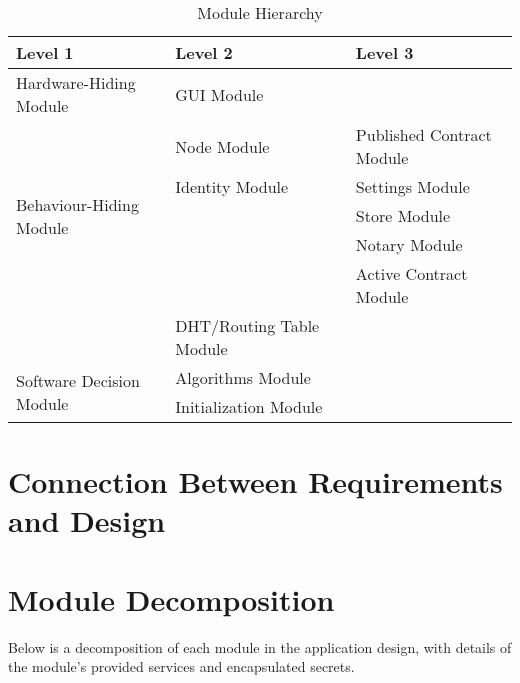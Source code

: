 \documentclass{article}
\begin{document}
\begin{table}[h!]
	\centering
	\begin{tabular}{p{} p{} p{}}
		\toprule
		\textbf{Level 1} & \textbf{Level 2} & \textbf{Level 3}\\
		\midrule
		
		{Hardware-Hiding Module} & GUI Module & ~ \\
		\midrule
		
		\multirow{5}{0.4\textwidth}{Behaviour-Hiding Module} & Node Module & Published Contract Module \\
		& Identity Module & Settings Module\\
		& ~ & Store Module\\
		& ~ & Notary Module\\
		& ~ & Active Contract Module\\
		& DHT/Routing Table Module & ~\\
		\midrule
		
		\multirow{3}{0.4\textwidth}{Software Decision Module} & Algorithms Module & ~ \\
		& Initialization Module & ~ \\
		\bottomrule
		
	\end{tabular}
	\caption{Module Hierarchy}
	\label{TblMH}
\end{table}



\section*{Connection Between Requirements and Design}

\section*{Module Decomposition}
Below is a decomposition of each module in the application design, with details of the module's provided services and encapsulated secrets.
\end{document}
